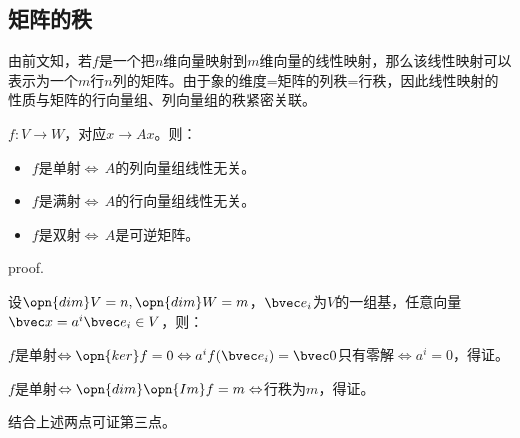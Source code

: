\subsection{矩阵的秩}
由前文知，若$f$是一个把$n$维向量映射到$m$维向量的线性映射，那么该线性映射可以表示为一个$m$行$n$列的矩阵。由于象的维度=矩阵的列秩=行秩，因此线性映射的性质与矩阵的行向量组、列向量组的秩紧密关联。
\begin{theorem}{}
$f:V\rightarrow W$，对应$x\rightarrow Ax$。则：
\begin{itemize}
\item $f$是单射$\Leftrightarrow\,A$的列向量组线性无关。
\item $f$是满射$\Leftrightarrow\,A$的行向量组线性无关。
\item $f$是双射$\Leftrightarrow\,A$是可逆矩阵。
\end{itemize}
\end{theorem}
proof.

设$\opn{dim}V=n,\opn{dim}W=m$，${\bvec e_i}$为$V$的一组基，任意向量$\bvec x=a^i\bvec e_i\in V$，则：

$f$是单射$\Leftrightarrow\opn{ker}f=0\Leftrightarrow a^if(\bvec e_i)=\bvec 0$只有零解$\Leftrightarrow a^i=0$，得证。

$f$是单射$\Leftrightarrow \opn{dim}\opn{Im}f=m\Leftrightarrow$行秩为$m$，得证。

结合上述两点可证第三点。